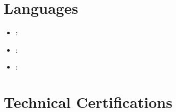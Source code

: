 \documentclass[11pt,a4paper]{article}
\begin{document}


\section{Languages}

\begin{itemize}
    \item \textbf{\languageOne}: \proficiencyOne
    \item \textbf{\languageTwo}: \proficiencyTwo
    \item \textbf{\languageThree}: \proficiencyThree
\end{itemize}

\section{Technical Certifications}
\begin{itemize}
    \certifications
\end{itemize}
\end{document}
